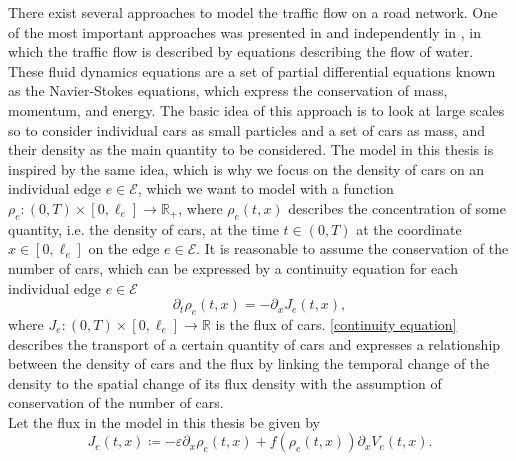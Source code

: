There exist several approaches to model the traffic flow on a road network. One of the most important approaches was presented in \cite{LighthillWhitham:1955} and independently in \cite{Richards:1956}, in which the traffic flow is described by equations describing the flow of water. These fluid dynamics equations are a set of partial differential equations known as the Navier-Stokes equations, which express the conservation of mass, momentum, and energy. The basic idea of this approach is to look at large scales so to consider individual cars as small particles and a set of cars as mass, and their density as the main quantity to be considered. The model in this thesis is inspired by the same idea, which is why we focus on the density of cars on an individual edge $e \in \mathcal{E}$, which we want to model with a function $\rho_e \colon (0, T) \times [0, \ell_e] \to \mathbb{R}_{+}$, where $\rho_e (t,x)$ describes the concentration of some quantity, i.e. the density of cars, at the time $t \in (0, T)$ at the coordinate $x \in [0, \ell_e]$ on the edge $e \in \mathcal{E}$. It is reasonable to assume the conservation of the number of cars, which can be expressed by a continuity equation for each individual edge $e \in \mathcal{E}$
\begin{equation}
    \label{continuity equation}
    \partial_t \rho_e (t,x) = - \partial_x J_e(t,x),
\end{equation}
where $J_e \colon (0,T) \times [0, \ell_e] \to \mathbb{R}$ is the flux of cars. \cref{continuity equation} describes the transport of a certain quantity of cars and expresses a relationship between the density of cars and the flux by linking the temporal change of the density to the spatial change of its flux density with the assumption of conservation of the number of cars. \\
Let the flux in the model in this thesis be given by 
\begin{equation} 
    \label{eq:flux} 
    J_e(t,x) \coloneqq - \varepsilon \partial_x \rho_e (t, x) + f(\rho_e(t, x)) \partial_x V_e(t, x).
\end{equation}
